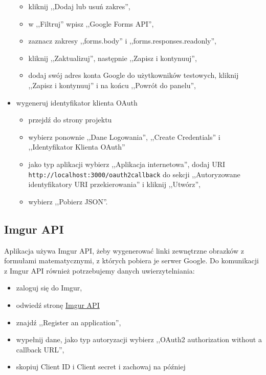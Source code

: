 \begin{itemize}
\begin{itemize}
      \item kliknij ,,Dodaj lub usuń zakres'',
      \item w ,,Filtruj'' wpisz ,,Google Forms API'',
      \item zaznacz zakresy ,,forms.body'' i ,,forms.responses.readonly'',
      \item kliknij ,,Zaktualizuj'', następnie ,,Zapisz i kontynuuj'',
      \item dodaj swój adres konta Google do użytkowników testowych, kliknij
      ,,Zapisz i kontynuuj'' i na końcu ,,Powrót do panelu'',
    \end{itemize}
  \item wygeneruj identyfikator klienta OAuth
    \begin{itemize}
      \item przejdź do strony projektu
      \item wybierz ponownie ,,Dane Logowania'', ,,Create Credentials''
            i ,,Identyfikator Klienta OAuth''
      \item jako typ aplikacji wybierz ,,Aplikacja internetowa'', dodaj URI 
            \\ \texttt{http://localhost:3000/oauth2callback} do sekcji ,,Autoryzowane 
            identyfikatory URI przekierowania'' i kliknij ,,Utwórz'',
      \item wybierz ,,Pobierz JSON''.
    \end{itemize}
\end{itemize}

\subsection{Imgur API}
Aplikacja używa Imgur API, żeby wygenerować linki zewnętrzne obrazków
z formułami matematycznymi, z których pobiera je serwer Google. Do komunikacji
z Imgur API również potrzebujemy danych uwierzytelniania:
\begin{itemize}
  \item zaloguj się do Imgur,
  \item odwiedź stronę \href{https://api.imgur.com/}{Imgur API}
  \item znajdź ,,Register an application'',
  \item wypełnij dane, jako typ autoryzacji wybierz ,,OAuth2 authorization without
  a callback URL'',
  \item skopiuj Client ID i Client secret i zachowaj na później
\end{itemize}

